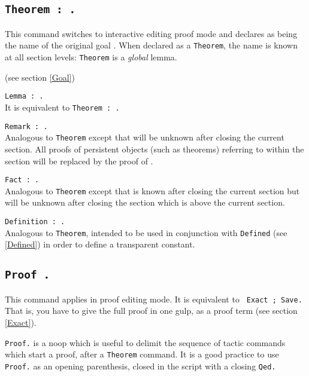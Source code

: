 \subsection{\tt Theorem {\ident} : {\form}.}\label{Theorem}
This command switches to interactive editing proof mode and declares
{\ident} as being the name of the original goal {\form}. When declared
as a {\tt Theorem}, the name {\ident} is known at all section levels:
{\tt Theorem} is a {\sl global} lemma.

\ErrMsg (see section \ref{Goal})

\begin{Variants}
\item {\tt Lemma {\ident} : {\form}.}\\
  It is equivalent to {\tt Theorem {\ident} : {\form}.}
\item {\tt Remark {\ident} : {\form}.}\\
  Analogous to {\tt Theorem} except that {\ident} will be unknown
  after closing the current section. All proofs of persistent objects
  (such as theorems) referring to {\ident} within the section will be
  replaced by the proof of {\ident}.  
\item {\tt Fact {\ident} : {\form}.}\\
  Analogous to {\tt Theorem} except that {\ident} is known after
  closing the current section but 
 will be unknown  after closing the section which is above the current section.
\item {\tt Definition {\ident} : {\form}.}
\\
  Analogous to {\tt Theorem}, intended to be used in conjunction with
  {\tt Defined} (see \ref{Defined}) in order to define a
  transparent constant.
\end{Variants}

\subsection{\tt Proof {\term}.}
This command applies in proof editing mode. It is equivalent to {\tt
  Exact {\term}; Save.} That is, you have to give the full proof in
one gulp, as a proof term (see section \ref{Exact}).

\begin{Variants}
\item{\tt Proof.} is a noop which is useful to delimit the sequence of
tactic commands which start a proof, after a {\tt Theorem} command.
It is a good practice to use {\tt Proof.} as an opening parenthesis,
closed in the script with a closing {\tt Qed.}
\end{Variants}

